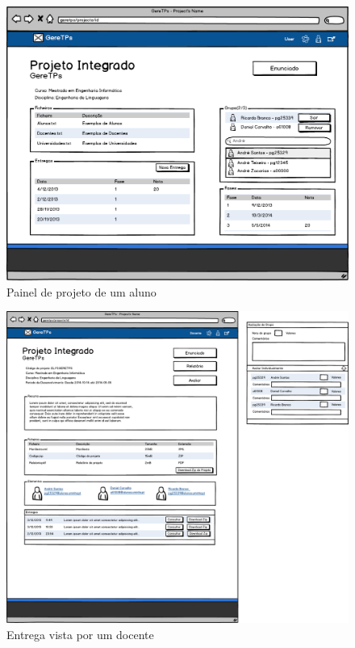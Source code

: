 \begin{figure}[htbp] 
        \centering
        \includegraphics[width=1\textwidth]{images/prototipos/mockups/painelprojetoaluno.png}
         \caption{Painel de projeto de um aluno}
         \label{fig: painelprojetoaluno}
\end{figure}




\begin{figure}[htbp] 
        \centering
        \includegraphics[width=1\textwidth]{images/prototipos/mockups/projetodocente.png}
         \caption{Entrega vista por um docente}
         \label{fig: projetodocente}
\end{figure}


